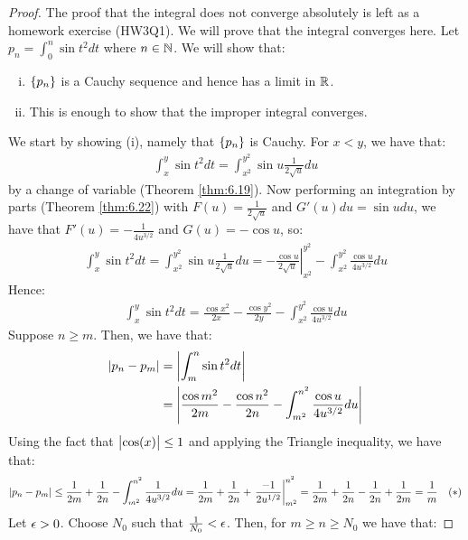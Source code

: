 \begin{proof}
    The proof that the integral does not converge absolutely is left as a homework exercise (HW3Q1). We will prove that the integral converges here. Let $p_n = \int_0^n \sin t^2dt$ where $n \in \mathbb{N}$. We will show that:
    \begin{enumerate}[(i)]
        \item $\set{p_n}$ is a Cauchy sequence and hence has a limit in $\mathbb{R}$.
        \item This is enough to show that the improper integral converges.
    \end{enumerate}
    We start by showing (i), namely that $\set{p_n}$ is Cauchy. For $x < y$, we have that:
    \begin{align*}
        \int_x^y \sin t^2 dt = \int_{x^2}^{y^2} \sin u \frac{1}{2\sqrt{u}}du
    \end{align*}
    by a change of variable (Theorem \ref{thm:6.19}). Now performing an integration by parts (Theorem \ref{thm:6.22}) with $F(u) = \frac{1}{2\sqrt{u}}$ and $G'(u)du = \sin u du$, we have that $F'(u) = -\frac{1}{4u^{3/2}}$ and $G(u) = -\cos u$, so:
    \begin{align*}
        \int_x^y \sin t^2 dt = \int_{x^2}^{y^2} \sin u \frac{1}{2\sqrt{u}}du = \left.-\frac{\cos u}{2\sqrt{u}}\right|_{x^2}^{y^2} - \int_{x^2}^{y^2} \frac{\cos u}{4u^{3/2}} du
    \end{align*}
    Hence:
    \begin{align*}
        \int_x^y \sin t^2 dt = \frac{\cos x^2}{2x} - \frac{\cos y^2}{2y} - \int_{x^2}^{y^2} \frac{\cos u}{4u^{3/2}}du
    \end{align*}
    Suppose $n \geq m$. Then, we have that:
    \begin{align*}
        \abs{p_n - p_m} &= \abs{\int_m^n \sin t^2 dt}
        \\ &= \abs{\frac{\cos m^2}{2m} - \frac{\cos n^2}{2n} - \int_{m^2}^{n^2} \frac{\cos u}{4 u^{3/2}}du }
    \end{align*}
    Using the fact that $\abs{\cos(x)} \leq 1$ and applying the Triangle inequality, we have that:
    \begin{align*}
        \abs{p_n - p_m} \leq \frac{1}{2m} + \frac{1}{2n} - \int_{m^2}^{n^2} \frac{1}{4u^{3/2}}du = \frac{1}{2m} + \frac{1}{2n} + \left. \frac{-1}{2u^{1/2}}\right|_{m^2}^{n^2} = \frac{1}{2m} + \frac{1}{2n} - \frac{1}{2n} + \frac{1}{2m} = \frac{1}{m} \quad (*)
    \end{align*}
    Let $\epsilon > 0$. Choose $N_0$ such that $\frac{1}{N_0} < \epsilon$. Then, for $m \geq n \geq N_0$ we have that:

\end{proof}
